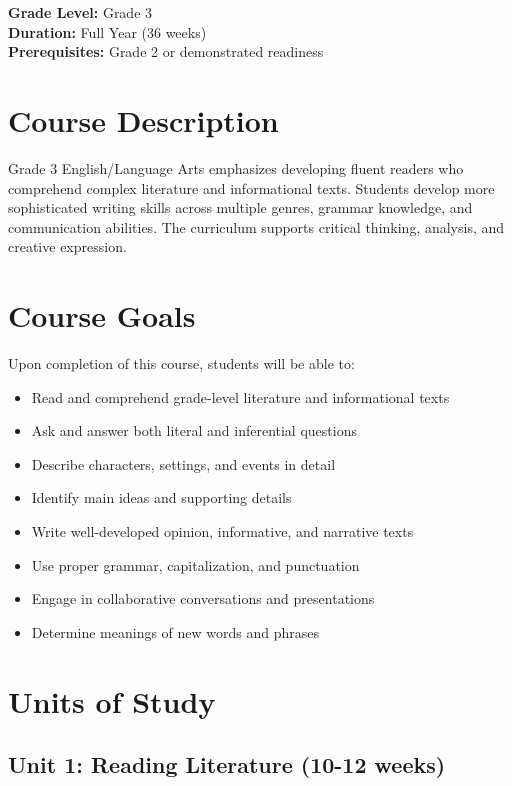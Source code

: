 \documentclass[11pt,letterpaper]{report}
\begin{document}
\textbf{Grade Level:} Grade 3\\
\textbf{Duration:} Full Year (36 weeks)\\
\textbf{Prerequisites:} Grade 2 or demonstrated readiness

\section{Course Description}

Grade 3 English/Language Arts emphasizes developing fluent readers who comprehend complex literature and informational texts. Students develop more sophisticated writing skills across multiple genres, grammar knowledge, and communication abilities. The curriculum supports critical thinking, analysis, and creative expression.

\section{Course Goals}

Upon completion of this course, students will be able to:

\begin{itemize}
    \item Read and comprehend grade-level literature and informational texts
    \item Ask and answer both literal and inferential questions
    \item Describe characters, settings, and events in detail
    \item Identify main ideas and supporting details
    \item Write well-developed opinion, informative, and narrative texts
    \item Use proper grammar, capitalization, and punctuation
    \item Engage in collaborative conversations and presentations
    \item Determine meanings of new words and phrases
\end{itemize}

\section{Units of Study}

\subsection{Unit 1: Reading Literature (10-12 weeks)}
\end{document}
